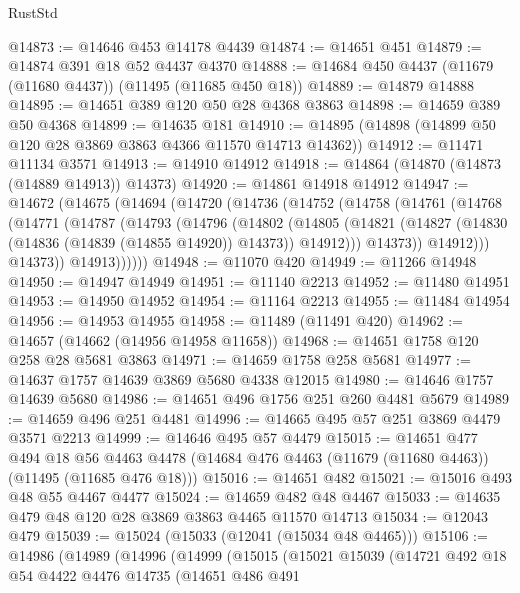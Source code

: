 \begin{lexlean}{RustStd}
\begin{coremodule}
@14873 := @14646 @453 @14178 @4439
@14874 := @14651 @451
@14879 := @14874 @391 @18 @52 @4437 @4370
@14888 := @14684 @450 @4437 (@11679 (@11680 @4437)) (@11495 (@11685 @450 @18))
@14889 := @14879 @14888
@14895 := @14651 @389 @120 @50 @28 @4368 @3863
@14898 := @14659 @389 @50 @4368
@14899 := @14635 @181
@14910 := @14895 (@14898 (@14899 @50 @120 @28 @3869 @3863 @4366 @11570 @14713 @14362))
@14912 := @11471 @11134 @3571
@14913 := @14910 @14912
@14918 := @14864 (@14870 (@14873 (@14889 @14913)) @14373)
@14920 := @14861 @14918 @14912
@14947 := @14672
    (@14675
      (@14694
        (@14720
          (@14736
            (@14752
              (@14758
                (@14761
                  (@14768
                    (@14771
                      (@14787
                        (@14793
                          (@14796
                            (@14802
                              (@14805
                                (@14821
                                  (@14827
                                    (@14830 (@14836 (@14839 (@14855 @14920)) @14373))
                                    @14912)))
                              @14373))
                          @14912)))
                    @14373))
                @14913))))))
@14948 := @11070 @420
@14949 := @11266 @14948
@14950 := @14947 @14949
@14951 := @11140 @2213
@14952 := @11480 @14951
@14953 := @14950 @14952
@14954 := @11164 @2213
@14955 := @11484 @14954
@14956 := @14953 @14955
@14958 := @11489 (@11491 @420)
@14962 := @14657 (@14662 (@14956 @14958 @11658))
@14968 := @14651 @1758 @120 @258 @28 @5681 @3863
@14971 := @14659 @1758 @258 @5681
@14977 := @14637 @1757 @14639 @3869 @5680 @4338 @12015
@14980 := @14646 @1757 @14639 @5680
@14986 := @14651 @496 @1756 @251 @260 @4481 @5679
@14989 := @14659 @496 @251 @4481
@14996 := @14665 @495 @57 @251 @3869 @4479 @3571 @2213
@14999 := @14646 @495 @57 @4479
@15015 := @14651
    @477
    @494
    @18
    @56
    @4463
    @4478
    (@14684 @476 @4463 (@11679 (@11680 @4463)) (@11495 (@11685 @476 @18)))
@15016 := @14651 @482
@15021 := @15016 @493 @48 @55 @4467 @4477
@15024 := @14659 @482 @48 @4467
@15033 := @14635 @479 @48 @120 @28 @3869 @3863 @4465 @11570 @14713
@15034 := @12043 @479
@15039 := @15024 (@15033 (@12041 (@15034 @48 @4465)))
@15106 := @14986
    (@14989
      (@14996
        (@14999
          (@15015
            (@15021
              @15039
              (@14721
                @492
                @18
                @54
                @4422
                @4476
                @14735
                (@14651
                  @486
                  @491

\end{coremodule}
\end{lexlean}
